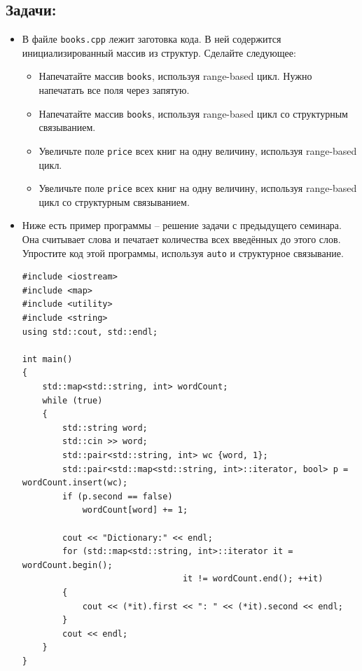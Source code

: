 \documentclass{article}
\begin{document}
\subsection*{Задачи:}
\begin{itemize}
\item В файле \texttt{books.cpp} лежит заготовка кода. В ней содержится инициализированный массив из структур. Сделайте следующее:
\begin{itemize}
\item Напечатайте массив \texttt{books}, используя range-based цикл. Нужно напечатать все поля через запятую.
\item Напечатайте массив \texttt{books}, используя range-based цикл со структурным связыванием.
\item Увеличьте поле \texttt{price} всех книг на одну величину, используя range-based цикл.
\item Увеличьте поле \texttt{price} всех книг на одну величину, используя range-based цикл со структурным связыванием.
\end{itemize}
\item Ниже есть пример программы -- решение задачи с предыдущего семинара. Она считывает слова и печатает количества всех введённых до этого слов.
Упростите код этой программы, используя \texttt{auto} и структурное связывание.
\begin{lstlisting}
#include <iostream>
#include <map>
#include <utility>
#include <string>
using std::cout, std::endl;

int main() 
{
    std::map<std::string, int> wordCount;
    while (true) 
    {
        std::string word;
        std::cin >> word;
        std::pair<std::string, int> wc {word, 1};
        std::pair<std::map<std::string, int>::iterator, bool> p = wordCount.insert(wc);
        if (p.second == false)
            wordCount[word] += 1;
        
        cout << "Dictionary:" << endl;
        for (std::map<std::string, int>::iterator it = wordCount.begin(); 
                                it != wordCount.end(); ++it)
        {
            cout << (*it).first << ": " << (*it).second << endl;
        }
        cout << endl;
    } 
}
\end{lstlisting}
\end{itemize}
\end{document}
